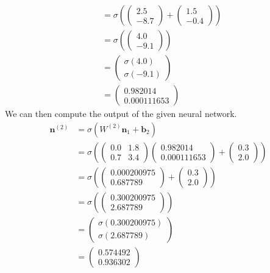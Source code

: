 \documentclass[11pt,letterpaper]{article}
\begin{document}
\begin{enumerate}[(a)]
\[\begin{aligned}
	&= \sigma \left( \begin{pmatrix} 2.5 \\ -8.7 \end{pmatrix} + \begin{pmatrix} 1.5 \\ -0.4 \end{pmatrix} \right) \\[0.3cm]
	&= \sigma \left( \begin{pmatrix} 4.0 \\ -9.1 \end{pmatrix} \right) \\[0.3cm]
	&= \begin{pmatrix} \sigma(4.0) \\ \sigma(-9.1) \end{pmatrix} \\[0.3cm]
	&= \begin{pmatrix} 0.982014 \\ 0.000111653 \end{pmatrix}
	\end{aligned}
	\]
We can then compute the output of the given neural network. 
	\[
	\begin{aligned}
	\mathbf{n}^{(2)}&= \sigma(W^{(2)} \mathbf{n}_1 + \mathbf{b}_2) \\[0.3cm]
	&= \sigma \left( 
	\begin{pmatrix} 
	0.0 & 1.8 \\
	0.7 & 3.4
	\end{pmatrix}
	\begin{pmatrix} 0.982014 \\ 0.000111653 \end{pmatrix} + \begin{pmatrix} 0.3 \\ 2.0 \end{pmatrix}
	\right) \\[0.3cm]
	&= \sigma \left( \begin{pmatrix} 0.000200975 \\ 0.687789 \end{pmatrix} + \begin{pmatrix} 0.3 \\ 2.0 \end{pmatrix} \right) \\[0.3cm]
	&= \sigma \left( \begin{pmatrix} 0.300200975 \\ 2.687789 \end{pmatrix} \right) \\[0.3cm]
	&= \begin{pmatrix} \sigma(0.300200975) \\ \sigma(2.687789) \end{pmatrix} \\[0.3cm]
	&= \begin{pmatrix} 0.574492 \\ 0.936302 \end{pmatrix}
	\end{aligned}
	\]
\end{enumerate}
\end{document}
